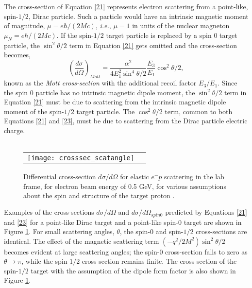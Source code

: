 The cross-section of Equation \eqref{21} represents electron scattering from a point-like, spin-$1/2$, Dirac particle. Such a particle would have an intrinsic magnetic moment of magnitude, $\mu=e\hbar/(2Mc)$, \emph{i.e.}, $\mu=1$ in units of the nuclear magneton $\mu_N=e\hbar/(2Mc)$. If the spin-$1/2$ target particle is replaced by a spin 0 target particle, the $\sin^2 \theta /2$ term in Equation \eqref{21} gets omitted and the cross-section becomes,
 \begin{equation}
 \label{23}
  \left(\frac{d\sigma}{d\Omega}\right)_{Mott} = \frac {\alpha^2}{4E_1^2\sin^4 \theta/2} \frac{E_3}{E_1} \cos^2 \theta/2, 
\end{equation}
known as the \emph{Mott cross-section} with the additional recoil factor $E_3/E_1$. Since the spin 0 particle has no intrinsic magnetic dipole moment, the $\sin^2 \theta /2$ term in Equation \eqref{21} must be due to scattering from the intrinsic magnetic dipole moment of the spin-$1/2$ target particle. The $\cos^2\theta /2$ term, common to both Equations \eqref{21} and \eqref{23}, must be due to scattering from the Dirac particle electric charge.
\\ ~
\begin{figure}[htbp]
\centering
\begin{tabular}{cc}
\mbox{\texttt{[image: crosssec\_scatangle]}}
\end{tabular}
\caption[Differential cross-section $d\sigma / d\Omega$ for elastic $e^-p$ scattering in the lab frame, for electron beam energy of 0.5 GeV, for various assumptions about the spin and structure of the target proton.]{Differential cross-section $d\sigma / d\Omega$ for elastic $e^-p$ scattering in the lab frame, for electron beam energy of 0.5 GeV, for various assumptions about the spin and structure of the target proton \cite{6}.}
\label{fig2}
\end{figure}

Examples of the cross-sections $d\sigma/ d\Omega$ and $d\sigma/d\Omega_{spin 0}$ predicted by Equations \eqref{21} and \eqref{23} for a point-like Dirac target and a point-like spin-0 target are shown in Figure \ref{fig2}. For small scattering angles, $\theta$, the spin-0 and spin-$1/2$ cross-sections are identical. The effect of the magnetic scattering term $(-q^2/2M^2)\sin^2 \theta /2$ becomes evident at large scattering angles; the spin-0 cross-section falls to zero as $\theta \rightarrow \pi$, while the spin-$1/2$ cross-section remains finite. The cross-section of the spin-$1/2$ target with the assumption of the dipole form factor is also shown in Figure \ref{fig2}. 

